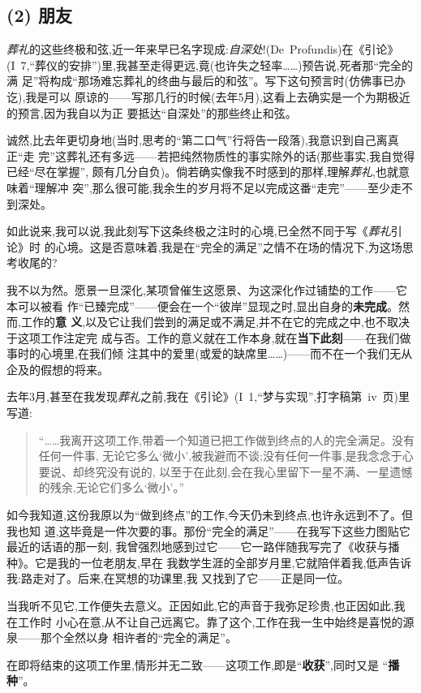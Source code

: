 \subsection{(2) 朋友}


\emph{葬礼}的这些终极和弦,近一年来早已名字现成:\emph{自深处}!(De~Profundis)在《引论》
(I~7,“葬仪的安排”)里,我甚至走得更远,竟(也许失之轻率……)预告说,死者那“完全的满
足”将构成“那场难忘葬礼的终曲与最后的和弦”。写下这句预言时(仿佛事已办讫),我是可以
原谅的——写那几行的时候(去年5月),这看上去确实是一个为期极近的预言,因为我自以为正
要抵达“自深处”的那些终止和弦。

诚然,比去年更切身地(当时,思考的“第二口气”行将告一段落),我意识到\dmark{}自己离真正“走
完”这葬礼还有多远——若把纯然物质性的事实除外的话(那些事实,我自觉得已经“尽在掌握”,
颇有几分自负)。倘若确实像我不时感到的那样,理解\emph{葬礼},也就意味着“理解冲
突”,那么很可能,我余生的岁月将不足以完成这番“走完”——至少走不到深处。

如此说来,我可以说,我此刻写下这条终极之注时的心境,已全然不同于写《\emph{葬礼}引论》时
的心境。这是否意味着,我是在“完全的满足”之情不在场的情况下,为这场思考收尾的?

我不以为然。愿景一旦深化,某项曾催生这愿景、为这深化作过铺垫的工作——它本可以被看
作“已臻完成”——便会在一个“彼岸”显现之时,显出自身的\textbf{未完成}。然而,工作的\textbf{意
义},以及它让我们尝到的满足或不满足,并不在它的完成之中,也不取决于这项工作注定完
成与否。工作的意义就在工作本身,就在\textbf{当下此刻}——在我们做事时的心境里,在我们倾
注其中的爱里(或爱的缺席里……)——而不在一个我们无从企及的假想的将来。

去年3月,甚至在我发现\emph{葬礼}之前,我在《引论》(I~1,“梦与实现”,打字稿第~iv~页)里写道:

\begin{quote}
“……我离开这项工作,带着一个知道已把工作做到终点的人的完全满足。没有任何一件事,
无论它多么‘微小’,被我避而不谈;没有任何一件事,是我念念于心要说、却终究没有说的,
以至于在此刻,会在我心里留下一星不满、一星遗憾的残余,无论它们多么‘微小’。”
\end{quote}

如今我知道,这份我原以为“做到终点”的工作,今天仍未到终点,也许永远到不了。但我也知
道,这毕竟是一件次要的事。那份“完全的满足”——在我写下这些力图贴它最近的话语的那一刻,
我曾强烈地感到过它——它一路伴随我写完了\dmark{}《收获与播种》。它是我的一位老朋友,早在
我数学生涯的全部岁月里,它就陪伴着我,低声告诉我:路走对了。后来,在冥想的功课里,我
又找到了它——正是同一位。

当我听不见它,工作便失去意义。正因如此,它的声音于我弥足珍贵,也正因如此,我在工作时
小心在意,从不让自己远离它。靠了这个,工作在我一生中始终是喜悦的源泉——那个全然以身
相许者的“完全的满足”。

在即将结束的这项工作里,情形并无二致——这项工作,即是“\textbf{收获}”,同时又是
“\textbf{播种}”。
